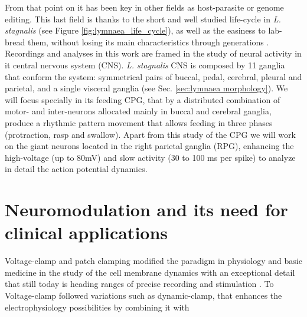  From that point on it has been key in other fields as host-parasite or genome editing. This last field is thanks to the short and well studied life-cycle in \textit{L. stagnalis} (see Figure \ref{fig:lymnaea_life_cycle}), as well as the easiness to lab-bread them, without losing its main characteristics through generations \parencite{noland_observations_1946}. Recordings and analyses in this work are framed in the study of neural activity in it central nervous system (CNS). \textit{L. stagnalis} CNS is composed by 11 ganglia that conform the system: symmetrical pairs of buccal, pedal, cerebral, pleural and parietal, and a single visceral ganglia (see Sec. \ref{sec:lymnaea morphology}). We will focus specially in its feeding CPG, that by a distributed combination of motor- and inter-neurons allocated mainly in buccal and cerebral ganglia, produce a rhythmic pattern movement that allows feeding in three phases (protraction, rasp and swallow). Apart from this study of the CPG we will work on the giant neurons located in the right parietal ganglia (RPG), enhancing the high-voltage (up to 80mV) and slow activity (30 to 100 ms per spike) to analyze in detail the action potential dynamics. 


\section{Neuromodulation and its need for clinical applications}


Voltage-clamp and patch clamping modified the paradigm in physiology and basic medicine in the study of the cell membrane dynamics with an exceptional detail that still today is heading ranges of precise recording and stimulation \parencite{hamill_improved_1981} . To Voltage-clamp followed variations such as dynamic-clamp, that enhances the electrophysiology possibilities by combining it with 


